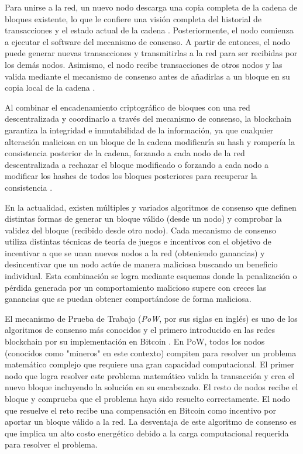 Para unirse a la red, un nuevo nodo descarga una copia completa de la cadena de bloques existente, lo que le confiere una visión completa del historial de transacciones y el estado actual de la cadena \cite{bulkowska2023implementation}. Posteriormente, el nodo comienza a ejecutar el software del mecanismo de consenso. A partir de entonces, el nodo puede generar nuevas transacciones y transmitirlas a la red para ser recibidas por los demás nodos. Asimismo, el nodo recibe transacciones de otros nodos y las valida mediante el mecanismo de consenso antes de añadirlas a un bloque en su copia local de la cadena \cite{bulkowska2023implementation}.

Al combinar el encadenamiento criptográfico de bloques con una red descentralizada y coordinarlo a través del mecanismo de consenso, la blockchain garantiza la integridad e inmutabilidad de la información, ya que cualquier alteración maliciosa en un bloque de la cadena modificaría su hash y rompería la consistencia posterior de la cadena, forzando a cada nodo de la red descentralizada a rechazar el bloque modificado o forzando a cada nodo a modificar los hashes de todos los bloques posteriores para recuperar la consistencia \cite{sunny2022systematic}.

En la actualidad, existen múltiples y variados algoritmos de consenso que definen distintas formas de generar un bloque válido (desde un nodo) y comprobar la validez del bloque (recibido desde otro nodo). Cada mecanismo de consenso utiliza distintas técnicas de teoría de juegos e incentivos con el objetivo de incentivar a que se unan nuevos nodos a la red (obteniendo ganancias) y desincentivar que un nodo actúe de manera maliciosa buscando un beneficio individual. Esta combinación se logra mediante esquemas donde la penalización o pérdida generada por un comportamiento malicioso supere con creces las ganancias que se puedan obtener comportándose de forma maliciosa.

El mecanismo de Prueba de Trabajo (\textit{PoW}, por sus siglas en inglés) es uno de los algoritmos de consenso más conocidos y el primero introducido en las redes blockchain por su implementación en Bitcoin \cite{satoshi2008bitcoin}. En PoW, todos los nodos (conocidos como "mineros" en este contexto) compiten para resolver un problema matemático complejo que requiere una gran capacidad computacional. El primer nodo que logra resolver este problema matemático valida la transacción y crea el nuevo bloque incluyendo la solución en su encabezado. El resto de nodos recibe el bloque y comprueba que el problema haya sido resuelto correctamente. El nodo que resuelve el reto recibe una compensación en Bitcoin como incentivo por aportar un bloque válido a la red. La desventaja de este algoritmo de consenso es que implica un alto costo energético debido a la carga computacional requerida para resolver el problema.

